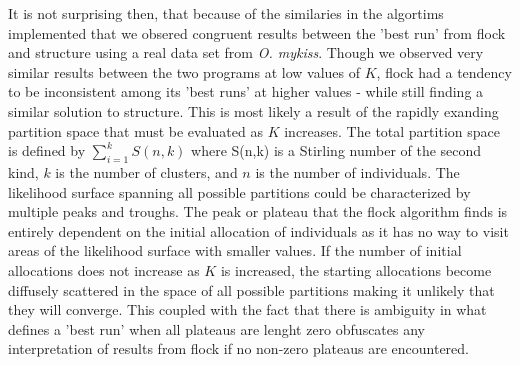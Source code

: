 It is not surprising then, that because of the similaries in the algortims implemented that 
we obsered  
congruent results between the 'best run' from {\sc flock} and {\sc structure} using 
a real data set from \textit{O. mykiss}. Though we observed very similar results
between the two programs at low values of $K$, {\sc flock} had a tendency to be inconsistent
among its 'best runs' at higher values - while still finding a similar solution to {\sc structure}.
This is most likely a result of the rapidly exanding partition space that must be evaluated as $K$ increases. 
The total partition space is 
defined by $\sum\limits_{i=1}^k S(n,k)$ where S(n,k) is a Stirling number of the 
second kind, $k$ is the number of clusters, and $n$ is the number of individuals.
The likelihood surface spanning all possible partitions could
be characterized by multiple peaks and troughs.
The peak or plateau that the  {\sc flock} algorithm finds is entirely dependent on the initial allocation of 
individuals as it has no way to visit areas of the likelihood surface with smaller values.
If the number of initial allocations does not increase
as $K$ is increased, the starting allocations become diffusely scattered in the space of all
possible partitions making it unlikely that they will converge. This coupled with the fact that there is 
ambiguity in what defines a 'best run' when all plateaus are lenght zero obfuscates any interpretation
of results from {\sc flock} if no non-zero plateaus are encountered.


